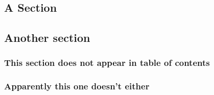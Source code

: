 \documentclass[salesmen, twoside]{softproj}
\begin{document}
\begin{projdoc}
\section{A Section}
\subsection{Another section}
\subsubsection{This section does not appear in table of contents}
\lipsum[1] %
\newpage
\subsubsection{Apparently this one doesn't either}
\lipsum[2] %
\end{projdoc}
\end{document}
